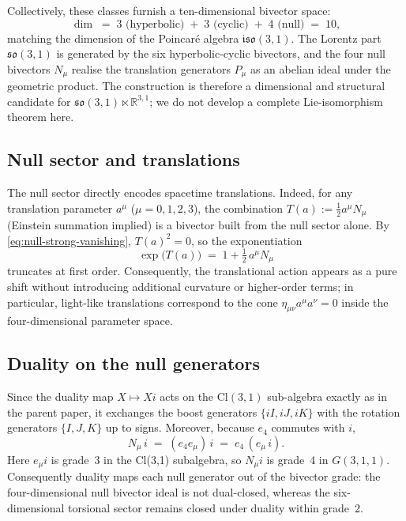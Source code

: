 \documentclass[dvipdfmx,a4paper]{article}
\theoremstyle{definition}
\theoremstyle{plain}
\theoremstyle{remark}
\begin{document}
Collectively, these classes furnish a ten-dimensional bivector space:
\[
\dim \;=\; 3 \text{ (hyperbolic)} \;+\; 3 \text{ (cyclic)} \;+\; 4 \text{ (null)} \;=\; 10,
\]
matching the dimension of the Poincar\'{e} algebra \(\mathfrak{iso}(3,1)\). The Lorentz part \(\mathfrak{so}(3,1)\) is generated by the six hyperbolic-cyclic bivectors, and the four null bivectors \(N_{\mu}\) realise the translation generators \(P_{\mu}\) as an abelian ideal under the geometric product. The construction is therefore a dimensional and structural candidate for \(\mathfrak{so}(3,1)\ltimes\mathbb{R}^{3,1}\); we do not develop a complete Lie-isomorphism theorem here.

\subsection{Null sector and translations}

The null sector directly encodes spacetime translations. Indeed, for any translation parameter \(a^{\mu}\) (\(\mu=0,1,2,3\)), the combination \(T(a):=\tfrac{1}{2}a^{\mu}N_{\mu}\) (Einstein summation implied) is a bivector built from the null sector alone. By \eqref{eq:null-strong-vanishing}, \(T(a)^{2}=0\), so the exponentiation
\[
\exp\bigl(T(a)\bigr) \;=\; 1 + \tfrac{1}{2}\,a^{\mu}N_{\mu}
\]
truncates at first order. Consequently, the translational action appears as a pure shift without introducing additional curvature or higher-order terms; in particular, light-like translations correspond to the cone \(\eta_{\mu\nu}a^{\mu}a^{\nu}=0\) inside the four-dimensional parameter space.

\subsection{Duality on the null generators}

Since the duality map \(X\mapsto Xi\) acts on the \(\mathrm{Cl}(3,1)\) sub-algebra exactly as in the parent paper, it exchanges the boost generators \(\{iI,iJ,iK\}\) with the rotation generators \(\{I,J,K\}\) up to signs. Moreover, because \(e_{4}\) commutes with \(i\),
\[
N_{\mu}\,i \;=\; (e_{4}e_{\mu})\,i \;=\; e_{4}\,(e_{\mu}\,i).
\]
Here \(e_{\mu}i\) is grade~3 in the Cl(3,1) subalgebra, so \(N_{\mu}i\) is grade~4 in \(G(3,1,1)\). Consequently duality maps each null generator out of the bivector grade: the four-dimensional null bivector ideal is not dual-closed, whereas the six-dimensional torsional sector remains closed under duality within grade~2.
\end{document}
